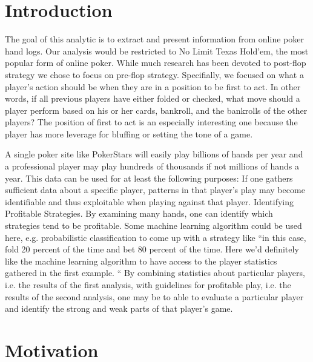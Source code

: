 \documentclass[twoside]{article}
\begin{document}
\begin{multicols}{2} %

\section{Introduction} 
The goal of this analytic is to extract and present information from online poker hand logs. Our analysis would be restricted to No Limit Texas Hold'em, the most popular form of online poker. While much research has been devoted to post-flop strategy we chose to focus on pre-flop strategy. Specifially, we focused on what a player's action should be when they are in a position to be 
first to act. In other words, if all previous players have either folded or checked, what move should a player perform based on his or her cards, bankroll, and the bankrolls of the other players? The position of first to act is an especially interesting one because the player has more leverage for bluffing or setting the tone of a game. 

A single poker site like PokerStars will easily play billions of hands per year and a professional player may play hundreds of thousands if not millions of hands a year. This data can be used for at least the following purposes:
If one gathers sufficient data about a specific player, patterns in that player's play may become identifiable and thus exploitable when playing against that player.
Identifying Profitable Strategies. By examining many hands, one can identify which strategies tend to be profitable. Some machine learning algorithm could be used here, e.g. probabilistic classification to come up with a strategy like ``in this case, fold 20 percent of the time and bet 80 percent of the time. Here we'd definitely like the machine learning algorithm to have access to the player statistics gathered in the first example. ``
By combining statistics about particular players, i.e. the results of the first analysis, with guidelines for profitable play, i.e. the results of the second analysis, one may be to able to evaluate a particular player and identify the strong and weak parts of that player's game.



\section{Motivation}


\end{multicols}
\end{document}
